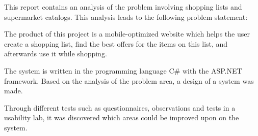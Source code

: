 This report contains an analysis of the problem involving shopping lists and supermarket catalogs. This analysis leads to the following problem statement:


The product of this project is a mobile-optimized website which helps the user create a shopping list, find the best offers for the items on this list, and afterwards use it while shopping.

The system is written in the programming language C\# with the ASP.NET framework. Based on the analysis of the problem area, a design of a system was made.

Through different tests such as questionnaires, observations and tests in a usability lab, it was discovered which areas could be improved upon on the system.

